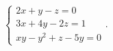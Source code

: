% 
% 
% 
% 
% 
% 
\(\left\{\begin{array}{l}2x+y-z=0\\3x+4y-2z=1\\xy-y^2+z-5y=0\end{array}\right.\).
% 
% 
